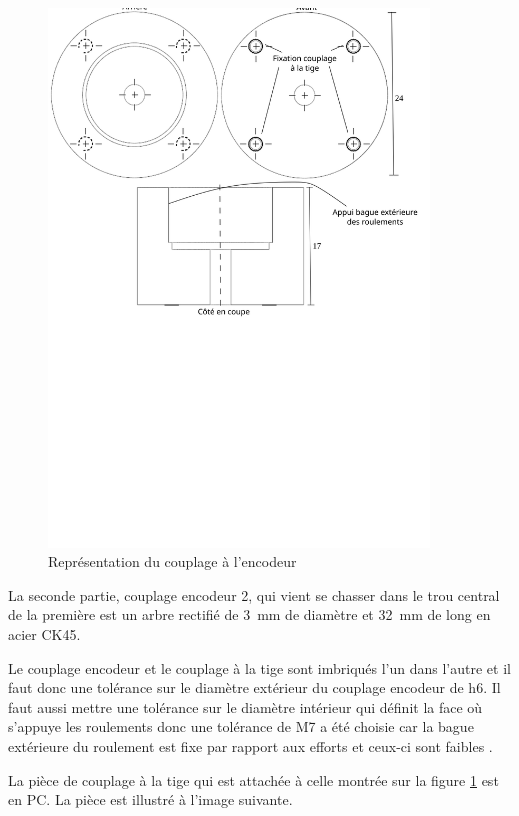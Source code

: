 \begin{figure}[H]
    \centering
    \includegraphics[width = 0.9\textwidth]{assets/figures/CouplageEncodeur.svg}
    \caption{Représentation du couplage à l'encodeur}
    \label{fig:CouplEnco}
\end{figure}

La seconde partie, couplage encodeur 2, qui vient se chasser dans le trou central de la première est un arbre rectifié de 3~mm de diamètre et 32~mm
de long en acier CK45.

Le couplage encodeur et le couplage à la tige sont imbriqués l'un dans l'autre et il faut donc une tolérance sur le diamètre extérieur du couplage encodeur de h6. Il faut aussi mettre une tolérance
sur le diamètre intérieur qui définit la face où s'appuye les roulements donc une tolérance de M7 a été choisie car la bague extérieure du
roulement est fixe par rapport aux efforts et ceux-ci sont faibles \cite{Ajustements}.

La pièce de couplage à la tige qui est attachée à celle montrée sur la figure \ref{fig:CouplEnco} est en \acrshort{PC}. La pièce est illustré à
l'image suivante.

